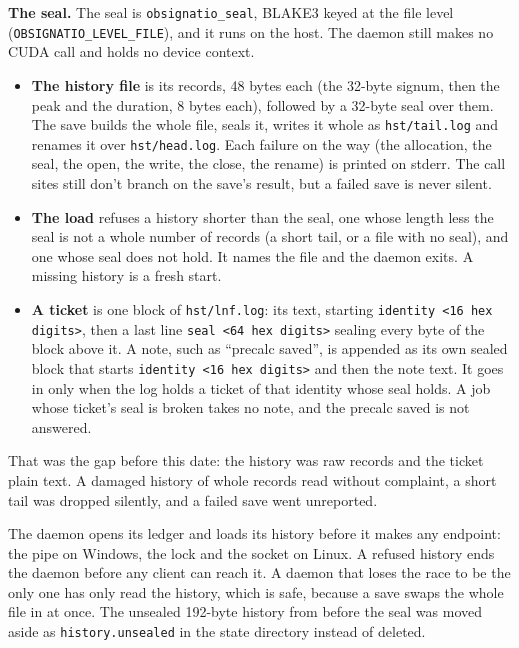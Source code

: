 \textbf{The seal.} The seal is \texttt{obsignatio\_\allowbreak{}seal}, BLAKE3 keyed at the file level (\texttt{OBSIGNATIO\_\allowbreak{}LEVEL\_\allowbreak{}FILE}), and it runs on the host. The daemon still makes no CUDA call and holds no device context.

\begin{itemize}
\item \textbf{The history file} is its records, 48 bytes each (the 32-byte signum, then the peak and the duration, 8 bytes each), followed by a 32-byte seal over them. The save builds the whole file, seals it, writes it whole as \texttt{hst/\allowbreak{}tail.\allowbreak{}log} and renames it over \texttt{hst/\allowbreak{}head.\allowbreak{}log}. Each failure on the way (the allocation, the seal, the open, the write, the close, the rename) is printed on stderr. The call sites still don't branch on the save's result, but a failed save is never silent.
\item \textbf{The load} refuses a history shorter than the seal, one whose length less the seal is not a whole number of records (a short tail, or a file with no seal), and one whose seal does not hold. It names the file and the daemon exits. A missing history is a fresh start.
\item \textbf{A ticket} is one block of \texttt{hst/\allowbreak{}lnf.\allowbreak{}log}: its text, starting \texttt{identity <16 hex digits>}, then a last line \texttt{seal <64 hex digits>} sealing every byte of the block above it. A note, such as “precalc saved”, is appended as its own sealed block that starts \texttt{identity <16 hex digits>} and then the note text. It goes in only when the log holds a ticket of that identity whose seal holds. A job whose ticket's seal is broken takes no note, and the precalc saved is not answered.
\end{itemize}

That was the gap before this date: the history was raw records and the ticket plain text. A damaged history of whole records read without complaint, a short tail was dropped silently, and a failed save went unreported.

The daemon opens its ledger and loads its history before it makes any endpoint: the pipe on Windows, the lock and the socket on Linux. A refused history ends the daemon before any client can reach it. A daemon that loses the race to be the only one has only read the history, which is safe, because a save swaps the whole file in at once. The unsealed 192-byte history from before the seal was moved aside as \texttt{history.\allowbreak{}unsealed} in the state directory instead of deleted.

